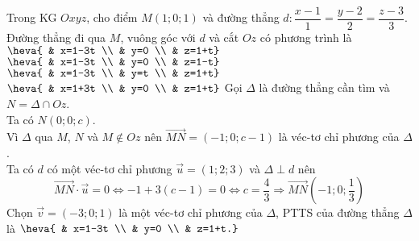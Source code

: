 \begin{ex}%
	Trong KG $Oxyz$, cho điểm $M(1;0;1)$ và đường thẳng $d\colon \dfrac{x-1}{1}=\dfrac{y-2}{2}=\dfrac{z-3}{3}$. Đường thẳng đi qua $M$, vuông góc với $d$ và cắt $Oz$ có phương trình là
	\choice
	{\True $\heva{ & x=1-3t \\ & y=0 \\ & z=1+t}$}
	{$\heva{ & x=1-3t \\ & y=0 \\ & z=1-t}$}
	{$\heva{ & x=1-3t \\ & y=t \\ & z=1+t}$}
	{$\heva{ & x=1+3t \\ & y=0 \\ & z=1+t}$}
	\loigiai
	{
		Gọi $\Delta$ là đường thẳng cần tìm và $N=\Delta \cap Oz$.\\
		Ta có $N(0;0;c)$. \\
		Vì $\Delta$ qua $M$, $N$ và $M\notin Oz$ nên $\overrightarrow{MN}=(-1;0;c-1)$ là véc-tơ chỉ phương của $\Delta$.\\
		Ta có $d$ có một véc-tơ chỉ phương $\overrightarrow{u}=(1;2;3)$ và $\Delta \perp d$ nên
		\[\overrightarrow{MN}\cdot\overrightarrow{u}=0 \Leftrightarrow -1+3(c-1)=0 \Leftrightarrow c=\dfrac{4}{3} \Rightarrow \overrightarrow{MN}\left(-1;0;\dfrac{1}{3}\right)\]
		Chọn $\overrightarrow{v}=(-3;0;1)$ là một véc-tơ chỉ phương của $\Delta$, PTTS của đường thẳng $\Delta$ là $\heva{ & x=1-3t \\ & y=0 \\ & z=1+t.}$
	}
\end{ex}

